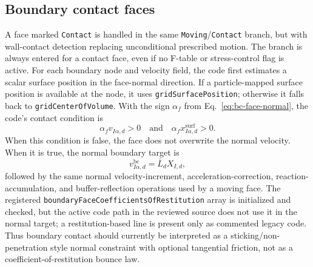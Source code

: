 \subsection{Boundary contact faces}
\label{subsec:bc-contact-wall}

A face marked \texttt{Contact} is handled in the same \texttt{Moving}/\texttt{Contact} branch, but with wall-contact detection replacing unconditional prescribed motion.  The branch is always entered for a contact face, even if no F-table or stress-control flag is active.  For each boundary node and velocity field, the code first estimates a scalar surface position in the face-normal direction.  If a particle-mapped surface position is available at the node, it uses \texttt{gridSurfacePosition}; otherwise it falls back to \texttt{gridCenterOfVolume}.  With the sign $\alpha_f$ from Eq.~\eqref{eq:bc-face-normal}, the code's contact condition is
\begin{equation}
  \alpha_f v_{I\alpha,d} > 0
  \quad\text{and}\quad
  \alpha_f x^{\mathrm{surf}}_{I\alpha,d} > 0.
  \label{eq:bc-wall-contact-condition}
\end{equation}
When this condition is false, the face does not overwrite the normal velocity.  When it is true, the normal boundary target is
\begin{equation}
  v_{I\alpha,d}^{\mathrm{bc}} = \bar L_d X_{I,d},
  \label{eq:bc-wall-normal-target}
\end{equation}
followed by the same normal velocity-increment, acceleration-correction, reaction-accumulation, and buffer-reflection operations used by a moving face.  The registered \texttt{boundaryFaceCoefficientsOfRestitution} array is initialized and checked, but the active code path in the reviewed source does not use it in the normal target; a restitution-based line is present only as commented legacy code.  Thus boundary contact should currently be interpreted as a sticking/non-penetration style normal constraint with optional tangential friction, not as a coefficient-of-restitution bounce law.

